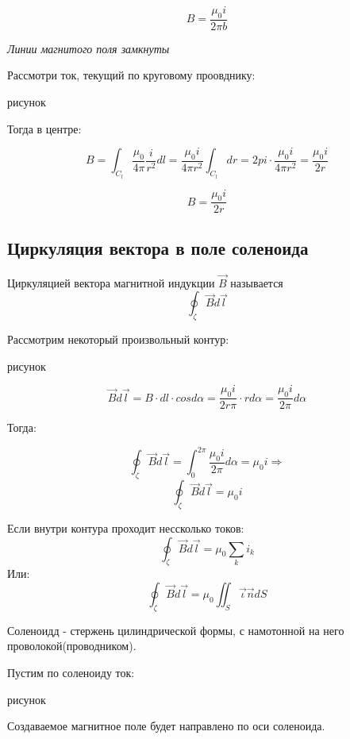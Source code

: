 \documentclass[../main.tex]{subfiles}
\begin{document}
\[B = \frac{\mu_0 i}{2 \pi b}\]

\textit{Линии магнитого поля замкнуты}

Рассмотри ток, текущий по круговому проовднику:

рисунок

Тогда в центре:

\[B = \int_{C_l} \frac{\mu_0}{4\pi} \frac{i}{r^2} dl = \frac{\mu_0 i}{4 \pi r^2} \int_{C_l} dr = 2 pi \cdot \frac{\mu_0 i}{4 \pi r^2} = \frac{\mu_0 i}{2r}\]

\[B = \frac{\mu_0 i}{2r}\]
\subsection{Циркуляция вектора в поле соленоида}
 Циркуляцией вектора магнитной индукции $\vec B$ называется 
\[\oint_{\zeta} \vec B d \vec l\]

Рассмотрим некоторый произвольный контур:

рисунок

\[\vec B d \vec l = B \cdot dl \cdot cos{d \alpha} = \frac{\mu_0 i}{2r \pi} \cdot r d \alpha = \frac{\mu_0 i}{2 \pi} d \alpha\]

Тогда:

\[\oint_{\zeta} \vec B d \vec l = \int_{0}^{2 \pi} \frac{\mu_0 i}{2 \pi} d \alpha = \mu_0 i \Rightarrow \]
\[\oint_{\zeta} \vec B d \vec l = \mu_0 i\]

Если внутри контура проходит нессколько токов:
\[\oint_{\zeta} \vec B d \vec l = \mu_0 \sum_{k} i_k\]
Или:
\[\oint_{\zeta} \vec B d \vec l = \mu_0 \iint_{S} \vec \iota  \vec n dS\]

 Соленоидд - стержень цилиндрической формы, с намотонной на него проволокой(проводником).

Пустим по соленоиду ток:

рисунок 

Создаваемое магнитное поле будет направлено по оси соленоида.
\end{document}
